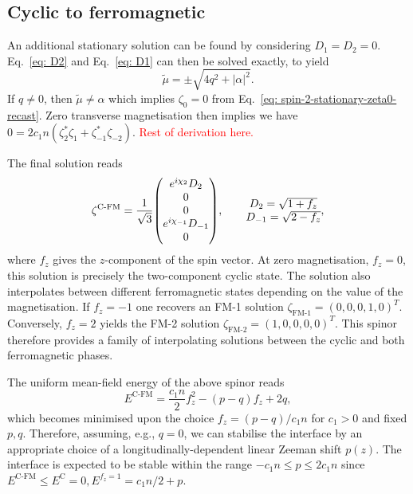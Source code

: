 \subsection{Cyclic to ferromagnetic}
An additional stationary solution can be found by considering \(D_1=D_2=0\).
Eq.~\eqref{eq: D2} and Eq.~\eqref{eq: D1} can then be solved exactly, to yield
\begin{equation}
    \tilde{\mu} = \pm \sqrt{4q^2 + |\alpha|^2}.
\end{equation}
If \(q \neq 0\), then \(\tilde{\mu} \neq \alpha \) which implies \(\zeta_0=0\)
from Eq.~\eqref{eq: spin-2-stationary-zeta0-recast}.
Zero transverse magnetisation then implies we have
\(0 = 2c_1n(\zeta_2^*\zeta_{1} + \zeta_{-1}^*\zeta_{-2})\).
\textcolor{red}{Rest of derivation here.}

The final solution reads
\begin{equation}\label{eq: C-FM-interpolating-spinor}
    \zeta^\text{C-FM} = \frac{1}{\sqrt{3}}\mqty(
    e^{i\chi_2}D_2 \\
    0 \\
    0 \\
    e^{i\chi_{-1}}D_{-1} \\
    0
    ), \qquad
    \mqty{
        D_2 = \sqrt{1 + f_z} \\
        D_{-1} = \sqrt{2 - f_z}
    }
    ,
\end{equation}
where \(f_z\) gives the \(z\)-component of the spin vector.
At zero magnetisation, \(f_z = 0\), this solution is precisely the two-component
cyclic state.
The solution also interpolates between different ferromagnetic states depending
on the value of the magnetisation.
If \(f_z = -1\) one recovers an FM-1 solution
\(\zeta_\text{FM-1} = {(0, 0, 0, 1, 0)}^T\).
Conversely, \(f_z = 2\) yields the FM-2 solution
\(\zeta_\text{FM-2} = {(1, 0, 0, 0, 0)}^T\).
This spinor therefore provides a family of interpolating solutions between the
cyclic and both ferromagnetic phases.

The uniform mean-field energy of the above spinor reads
\begin{equation}
    E^\text{C-FM} = \frac{c_1 n}{2} f_z^2 - (p-q)f_z +2q,
\end{equation}
which becomes minimised upon the choice \(f_z = (p-q)/c_1n\) for \(c_1 > 0\) and
fixed \(p, q\).
Therefore, assuming, e.g., \(q=0\), we can stabilise the interface by an
appropriate choice of a longitudinally-dependent linear Zeeman shift \(p(z)\).
The interface is expected to be stable within the range
\(-c_1n \leq p \leq 2c_1n\) since \(E^\text{C-FM} \leq
E^\text{C}=0, E^{f_z=1} = c_1n/2 + p\).

